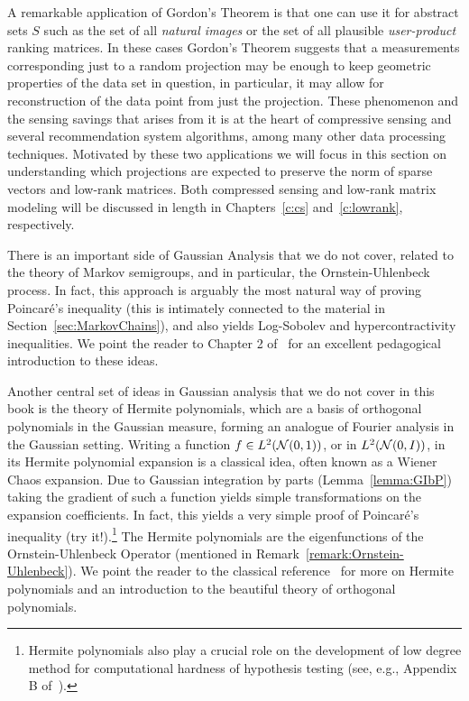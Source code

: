 A remarkable application of Gordon's Theorem is that one can use it for abstract sets $S$ such as the set of all \emph{natural images} or the set of all plausible \emph{user-product} ranking matrices. In these cases Gordon's Theorem suggests that a measurements corresponding just to a random projection may be enough to keep geometric properties of the data set in question, in particular, it may allow for reconstruction of the data point from just the projection. These phenomenon and the sensing savings that arises from it is at the heart of compressive sensing and several recommendation system algorithms, among many other data processing techniques. Motivated by these two applications we will focus in this section on understanding which projections are expected to preserve the norm of sparse vectors and low-rank matrices. 
Both compressed sensing and low-rank matrix modeling will be discussed in length in Chapters~\ref{c:cs} and~\ref{c:lowrank}, respectively.

\begin{remark}\label{remark:Ornstein-Uhlenbeck}
There is an important side of Gaussian Analysis that we do not cover, related to the theory of Markov semigroups, and in particular, the Ornstein-Uhlenbeck process. In fact, this approach is arguably the most natural way of proving Poincar\'{e}'s inequality (this is intimately connected to the material in Section~\ref{sec:MarkovChains}), and also yields Log-Sobolev and hypercontractivity inequalities. We point the reader to Chapter 2 of~\cite{vanHandel_LectureNotesProb_14} for an excellent pedagogical introduction to these ideas. 
\end{remark}

\begin{remark}\label{remark:HermitePolynomials}
Another central set of ideas in Gaussian analysis that we do not cover in this book is the theory of Hermite polynomials, which are a basis of orthogonal polynomials in the Gaussian measure, forming an analogue of Fourier analysis in the Gaussian setting. Writing a function $f\in L^2(\mathcal{N}(0,1))$, or in $L^2(\mathcal{N}(0,I))$, in its Hermite polynomial expansion is a classical idea, often known as a Wiener Chaos expansion. Due to Gaussian integration by parts (Lemma~\ref{lemma:GIbP}) taking the gradient of such a function yields simple transformations on the expansion coefficients. In fact, this yields a very simple proof of Poincar\'{e}'s inequality (try it!).\footnote{Hermite polynomials also play a crucial role on the development of low degree method for computational hardness of hypothesis testing (see, e.g., Appendix B of~\cite{KuniskyWeinBandeira2022LowDegreeSurvey}).} The Hermite polynomials are the eigenfunctions of the Ornstein-Uhlenbeck Operator (mentioned in Remark~\ref{remark:Ornstein-Uhlenbeck}). We point the reader to the classical reference~\cite{Szego1975OrthogonalPolynomials} for more on Hermite polynomials and an introduction to the beautiful theory of orthogonal polynomials.
\end{remark}


